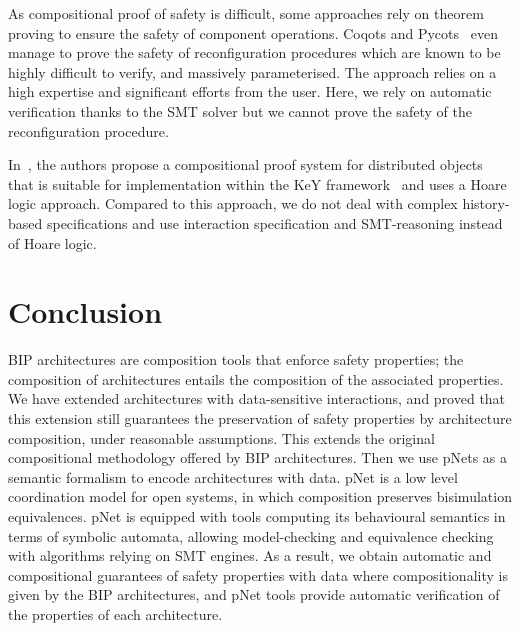 \documentclass{llncs}
\begin{document}
As compositional proof of safety is difficult, some approaches rely on theorem proving to ensure the safety of component operations. Coqots and Pycots~\cite{BCDLM:CBSE2014} even manage to prove the safety of reconfiguration procedures which are known to be highly difficult to verify, and massively parameterised. The approach relies on a high expertise and significant efforts from the user. Here, we rely on automatic verification thanks to the SMT solver but we cannot prove the safety of the reconfiguration procedure.




In~\cite{DDJO:JLAMP2012}, the authors propose a compositional proof system for distributed objects that is suitable for implementation within the KeY framework~\cite{BHS:Key2007} and uses a Hoare logic approach.
Compared to this  approach, we do not  deal with complex history-based specifications and use interaction specification and SMT-reasoning instead of Hoare logic. 



\section{Conclusion}
\label{secn:conclusion}

BIP architectures are composition tools that enforce safety properties; the composition of architectures entails the composition of the associated properties.
We have extended architectures with data-sensitive interactions, and proved that this extension still guarantees the preservation of safety properties by architecture composition, under reasonable assumptions. This extends the original compositional methodology offered by BIP architectures. Then we use pNets as a semantic formalism to encode architectures with data. pNet is a low level coordination model for open systems, in which composition preserves bisimulation equivalences. pNet is equipped with tools computing its behavioural semantics in terms of symbolic automata, allowing model-checking and equivalence checking with algorithms relying on SMT engines.
As a result, we obtain automatic and compositional guarantees of safety properties with data where compositionality is given by the BIP architectures, and pNet tools provide automatic verification of the properties of each architecture.
\end{document}
